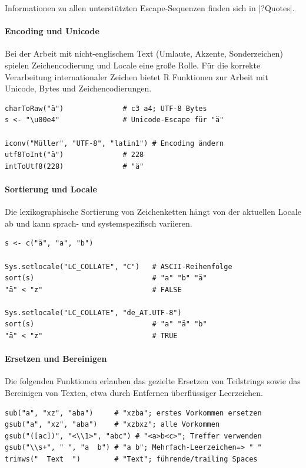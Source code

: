 \documentclass[10pt,twocolumn]{scrartcl}
\renewcommand{\lstinline}{\mycoloredinline}
\begin{document}
Informationen zu allen unterstützten Escape-Sequenzen finden sich in \lstinline|?Quotes|.

\paragraph{Encoding und Unicode}

Bei der Arbeit mit nicht-englischem Text (Umlaute, Akzente, Sonderzeichen) spielen Zeichencodierung und Locale eine große Rolle. Für die korrekte Verarbeitung internationaler Zeichen bietet R Funktionen zur Arbeit mit Unicode, Bytes und Zeichencodierungen.

\begin{lstlisting}
charToRaw("ä")              # c3 a4; UTF-8 Bytes
s <- "\u00e4"               # Unicode-Escape für "ä"

iconv("Müller", "UTF-8", "latin1") # Encoding ändern
utf8ToInt("ä")              # 228
intToUtf8(228)              # "ä"
\end{lstlisting}

\paragraph{Sortierung und Locale}

Die lexikographische Sortierung von Zeichenketten hängt von der aktuellen Locale ab und kann sprach- und systemspezifisch variieren.

\begin{lstlisting}
s <- c("ä", "a", "b")

Sys.setlocale("LC_COLLATE", "C")   # ASCII-Reihenfolge
sort(s)                            # "a" "b" "ä"
"ä" < "z"                          # FALSE

Sys.setlocale("LC_COLLATE", "de_AT.UTF-8")
sort(s)                            # "a" "ä" "b"
"ä" < "z"                          # TRUE
\end{lstlisting}

\paragraph{Ersetzen und Bereinigen}

Die folgenden Funktionen erlauben das gezielte Ersetzen von Teilstrings sowie das Bereinigen von Texten, etwa durch Entfernen überflüssiger Leerzeichen.

\begin{lstlisting}
sub("a", "xz", "aba")     # "xzba"; erstes Vorkommen ersetzen
gsub("a", "xz", "aba")    # "xzbxz"; alle Vorkommen
gsub("([ac])", "<\\1>", "abc") # "<a>b<c>"; Treffer verwenden
gsub("\\s+", " ", "a  b") # "a b"; Mehrfach-Leerzeichen=> " "
trimws("  Text  ")        # "Text"; führende/trailing Spaces
\end{lstlisting}
\end{document}
